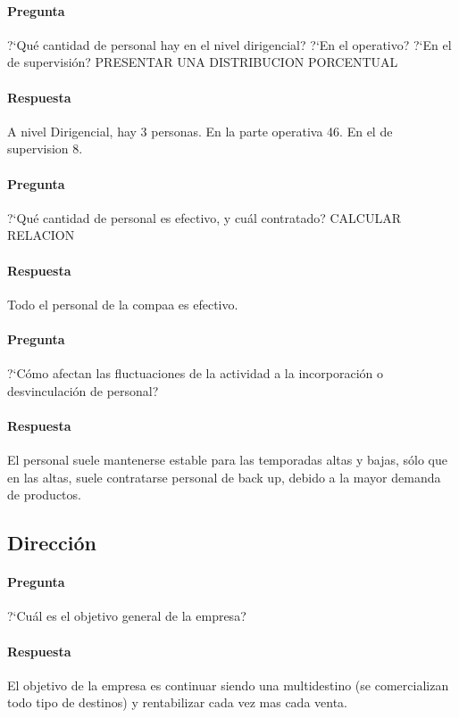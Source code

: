 \documentclass[12pt,a4paper,spanish]{article}
\begin{document}
	\paragraph{Pregunta}
	 ?`Qu\'e cantidad de personal hay en el nivel dirigencial?  ?`En el operativo?  ?`En el de supervisi\'on? PRESENTAR UNA DISTRIBUCION PORCENTUAL
	\paragraph{Respuesta}
	A nivel Dirigencial, hay 3 personas. En la parte operativa 46. En el de supervision 8.

	\paragraph{Pregunta}
	 ?`Qu\'e cantidad de personal es efectivo, y cu\'al contratado? CALCULAR RELACION
	\paragraph{Respuesta}
	Todo el personal de la compaa es efectivo.

	\paragraph{Pregunta}
	 ?`C\'omo afectan las fluctuaciones de la actividad a la incorporaci\'on o desvinculaci\'on de personal?
	\paragraph{Respuesta}
	El personal suele mantenerse estable para las temporadas altas y bajas, s\'olo que en las altas, suele contratarse personal de back up,  debido a la mayor demanda de productos.

	\subsection{Direcci\'on}

	\paragraph{Pregunta}
	 ?`Cu\'al es el objetivo general de la empresa?
	\paragraph{Respuesta}
	El objetivo de la empresa es continuar siendo una multidestino (se comercializan todo tipo de destinos) y rentabilizar cada vez mas cada venta.
\end{document}
